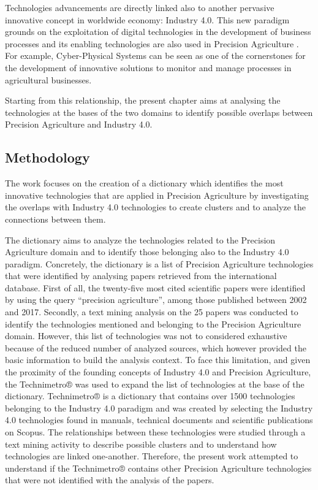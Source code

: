 \documentclass[]{book}
\theoremstyle{definition}
\theoremstyle{definition}
\theoremstyle{definition}
\theoremstyle{remark}
\begin{document}
Technologies advancements are directly linked also to another pervasive
innovative concept in worldwide economy: Industry 4.0. This new paradigm
grounds on the exploitation of digital technologies in the development
of business processes and its enabling technologies are also used in
Precision Agriculture . For example, Cyber-Physical Systems can be seen
as one of the cornerstones for the development of innovative solutions
to monitor and manage processes in agricultural businesses.

Starting from this relationship, the present chapter aims at analysing
the technologies at the bases of the two domains to identify possible
overlaps between Precision Agriculture and Industry 4.0.

\subsection{Methodology}\label{methodology-5}

The work focuses on the creation of a dictionary which identifies the
most innovative technologies that are applied in Precision Agriculture
by investigating the overlaps with Industry 4.0 technologies to create
clusters and to analyze the connections between them.

The dictionary aims to analyze the technologies related to the Precision
Agriculture domain and to identify those belonging also to the Industry
4.0 paradigm. Concretely, the dictionary is a list of Precision
Agriculture technologies that were identified by analysing papers
retrieved from the international database. First of all, the twenty-five
most cited scientific papers were identified by using the query
``precision agriculture'', among those published between 2002 and 2017.
Secondly, a text mining analysis on the 25 papers was conducted to
identify the technologies mentioned and belonging to the Precision
Agriculture domain. However, this list of technologies was not to
considered exhaustive because of the reduced number of analyzed sources,
which however provided the basic information to build the analysis
context. To face this limitation, and given the proximity of the
founding concepts of Industry 4.0 and Precision Agriculture, the
Technimetro® was used to expand the list of technologies at the base of
the dictionary. Technimetro® \citep{chiarello2018extracting} is a
dictionary that contains over 1500 technologies belonging to the
Industry 4.0 paradigm and was created by selecting the Industry 4.0
technologies found in manuals, technical documents and scientific
publications on Scopus. The relationships between these technologies
were studied through a text mining activity to describe possible
clusters and to understand how technologies are linked one-another.
Therefore, the present work attempted to understand if the Technimetro®
contains other Precision Agriculture technologies that were not
identified with the analysis of the papers.
\end{document}
